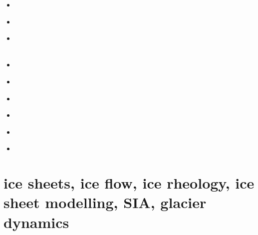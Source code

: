 \begin{small}
\begin{itemize}
\item[\twothousandseven]     
 \\
\item[\twothousandthirteen]       
 \\ 
\item[\twothousandfourteen]       
 \\ 
 \\ 
\item[\twothousandsixteen] 
\item[\twothousandseventeen] 
 \\ 
\item[\twothousandeighteen] 
\item[\twothousandtwenty]
 \\ 
\item[\twothousandtwentyone]
\item[\twothousandtwentytwo]
 \\
\end{itemize}
\end{small}



\section{ice sheets, ice flow, ice rheology, ice sheet modelling, SIA, glacier dynamics}

